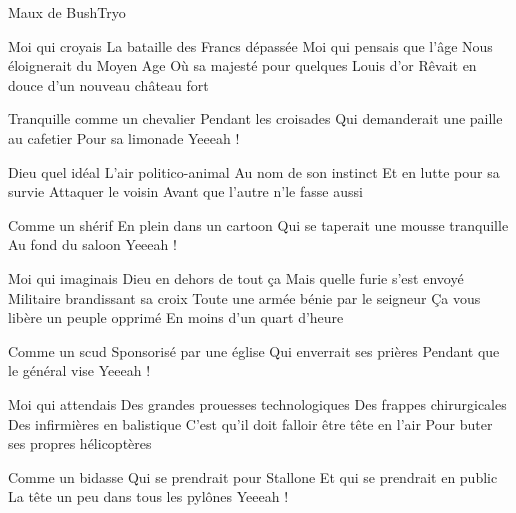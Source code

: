 \documentclass[a4paper,11pt,french]{article}
\begin{document}

\begin{Song}{Maux de Bush}{Tryo}
\begin{multicols}{2}

\begin{Verse}
Moi qui croyais 
La bataille des Francs dépassée
Moi qui pensais que l'âge
Nous éloignerait du Moyen Age
Où sa majesté pour quelques Louis d'or
Rêvait en douce d'un nouveau château fort
\end{Verse}
\espaceInterStrophe

\begin{Chorus}
Tranquille comme un chevalier
Pendant les croisades
Qui demanderait une paille au cafetier
Pour sa limonade
Yeeeah !
\end{Chorus}
\espaceInterStrophe

\begin{Verse}
Dieu quel idéal
L'air politico-animal
Au nom de son instinct 
Et en lutte pour sa survie
Attaquer le voisin 
Avant que l'autre n'le fasse aussi
\end{Verse}
\espaceInterStrophe

\begin{Chorus}
Comme un shérif 
En plein dans un cartoon
Qui se taperait une mousse tranquille 
Au fond du saloon
Yeeeah !
\end{Chorus}
\espaceInterStrophe

\begin{Verse}
Moi qui imaginais 
Dieu en dehors de tout ça
Mais quelle furie s'est envoyé
Militaire brandissant sa croix
Toute une armée bénie par le seigneur
Ça vous libère un peuple opprimé 
En moins d'un quart d'heure
\end{Verse}
\espaceInterStrophe

\begin{Chorus}
Comme un scud
Sponsorisé par une église
Qui enverrait ses prières
Pendant que le général vise
Yeeeah !
\end{Chorus}
\espaceInterStrophe

\begin{Verse}
Moi qui attendais 
Des grandes prouesses technologiques
Des frappes chirurgicales
Des infirmières en balistique
C'est qu'il doit falloir être tête en l'air
Pour buter ses propres hélicoptères
\end{Verse}
\espaceInterStrophe

\begin{Chorus}
Comme un bidasse 
Qui se prendrait pour Stallone
Et qui se prendrait en public 
La tête un peu dans tous les pylônes
Yeeeah !
\end{Chorus}
\espaceInterStrophe


\end{multicols}
\end{Song}
\end{document}
